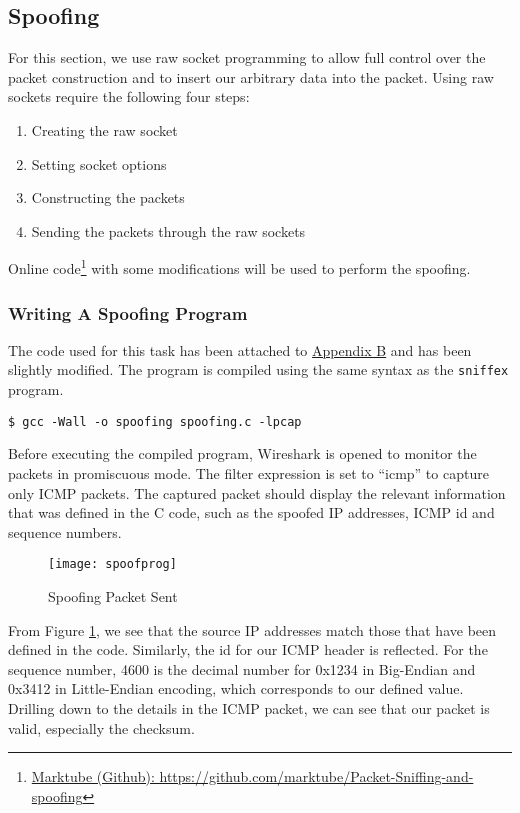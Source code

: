 \documentclass[a4paper,12pt]{article}
\begin{document}
\subsection{Spoofing}
For this section, we use raw socket programming to allow full control over the packet construction and to insert our arbitrary data into the packet. Using raw sockets require the following four steps:
\begin{enumerate}
\itemsep0em
\item Creating the raw socket
\item Setting socket options
\item Constructing the packets
\item Sending the packets through the raw sockets
\end{enumerate}
Online code\footnote{\href{https://github.com/marktube/Packet-Sniffing-and-spoofing}{Marktube (Github): https://github.com/marktube/Packet-Sniffing-and-spoofing}} with some modifications will be used to perform the spoofing.
\subsubsection{Writing A Spoofing Program}
The code used for this task has been attached to \hyperref[ch:ICMPSpoof]{Appendix B} and has been slightly modified. The program is compiled using the same syntax as the \texttt{sniffex} program.
\begin{verbatim}
$ gcc -Wall -o spoofing spoofing.c -lpcap
\end{verbatim}
Before executing the compiled program, Wireshark is opened to monitor the packets in promiscuous mode. The filter expression is set to ``icmp'' to capture only ICMP packets. The captured packet should display the relevant information that was defined in the C code, such as the spoofed IP addresses, ICMP id and sequence numbers.

\begin{figure}[H]
\centering
\texttt{[image: spoofprog]}
\caption{Spoofing Packet Sent}
\label{fig:spoofprog}
\end{figure}

\noindent From Figure \ref{fig:spoofprog}, we see that the source IP addresses match those that have been defined in the code. Similarly, the id for our ICMP header is reflected. For the sequence number, 4600 is the decimal number for 0x1234 in Big-Endian and 0x3412 in Little-Endian encoding, which corresponds to our defined value. Drilling down to the details in the ICMP packet, we can see that our packet is valid, especially the checksum.
\end{document}
